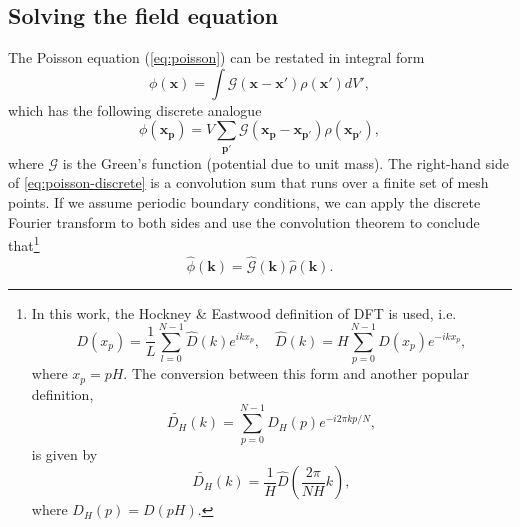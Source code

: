\subsection{Solving the field equation}\label{subsec:solving-the-field-equation}
The Poisson equation (\autoref{eq:poisson}) can be restated in integral form
\begin{equation*}
    \phi(\mathbf{x}) = \int \mathcal{G}(\mathbf{x}-\mathbf{x}')\rho(\mathbf{x}') dV',
\end{equation*}
which has the following discrete analogue
\begin{equation}\label{eq:poisson-discrete}
    \phi(\mathbf{x}_\mathbf{p}) = V \sum_{\mathbf{p}'} \mathcal{G}(\mathbf{x}_\mathbf{p} - \mathbf{x}_{\mathbf{p}'}) \rho(\mathbf{x}_{\mathbf{p}'}),
\end{equation}
where $\mathcal{G}$ is the Green's function (potential due to unit mass).
The right-hand side of \autoref{eq:poisson-discrete} is a convolution sum that runs over a finite set of mesh points.
If we assume periodic boundary conditions, we can apply the discrete Fourier transform to both sides and use the convolution theorem to conclude that\footnote{
    In this work, the Hockney \& Eastwood definition of DFT is used, i.e.
    \begin{equation*}
        D(x_p) = \frac{1}{L}\sum_{l=0}^{N-1}\hat{D}(k)e^{ikx_p}, \quad \hat{D}(k) = H\sum_{p=0}^{N-1}D(x_p)e^{-ikx_p},
    \end{equation*}
    where $x_p = pH$.
    The conversion between this form and another popular definition,
    \begin{equation}\label{eq:standard-dft}
        \widetilde{D_H}(k) = \sum_{p=0}^{N-1}D_H(p)e^{-i2\pi kp / N},
    \end{equation}
    is given by
    \begin{equation*}
        \widetilde{D_H}(k) = \frac{1}{H}\hat{D}\left(\frac{2\pi}{NH}k\right),
    \end{equation*}
    where $D_H(p) = D(pH)$.
}
\begin{equation}\label{eq:poisson-fourier-product}
    \hat{\phi}(\mathbf{k}) = \hat{\mathcal{G}}(\mathbf{k}) \hat{\rho}(\mathbf{k}).
\end{equation}

